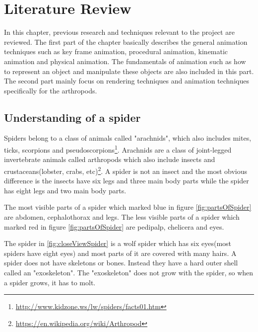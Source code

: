 \chapter{Literature Review}
In this chapter, previous research and techniques relevant to the
project are reviewed. The first part of the chapter basically describes
the general animation techniques such as key frame animation,
procedural animation, kinematic animation and physical animation. The
fundamentals of animation such as how to represent an object and
manipulate these objects are also included in this part. The second
part mainly focus on rendering techniques and animation techniques
specifically for the arthropods.

\section{Understanding of a spider} 
Spiders belong to a class of animals called "arachnids", which also includes mites, ticks, scorpions and pseudoscorpions\footnote{\url{http://www.kidzone.ws/lw/spiders/facts01.htm}}. Arachnids are a class of joint-legged invertebrate animals called arthropods which also include insects and crustaceans(lobster, crabs, etc)\footnote{\url{https://en.wikipedia.org/wiki/Arthropod}}. A spider is not an insect and the most obvious difference is the insects have six legs and three main body parts while the spider has eight legs and two main body parts. 

The most visible parts of a spider which marked blue in figure \ref{fig:partsOfSpider} are abdomen, cephalothorax and legs. The less visible parts of a spider which marked red in figure \ref{fig:partsOfSpider} are pedipalp, chelicera and eyes. 

The spider in \ref{fig:closeViewSpider} is a wolf spider which has six eyes(most spiders have eight eyes) and most parts of it are covered with many hairs. A spider does not have skeletons or bones. Instead they have a hard outer shell called an "exoskeleton". The "exoskeleton" does not grow with the spider, so when a spider grows, it has to molt.


